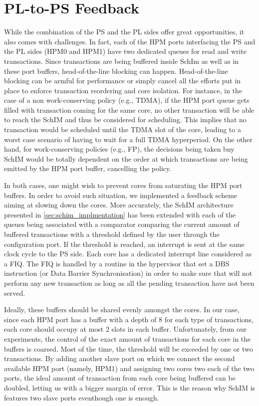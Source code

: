 \section{PL-to-PS Feedback}    
    While the combination of the PS and the PL sides offer great opportunities, it also comes with challenges. In fact, each of the HPM ports interfacing the PS and the PL sides (HPM0 and HPM1) have two dedicated queues for read and write transactions. Since transactions are being buffered inside SchIm as well as in these port buffers, head-of-the-line blocking can happen. Head-of-the-line blocking can be armful for performance or simply cancel all the efforts put in place to enforce transaction reordering and core isolation. For instance, in the case of a non work-conserving policy (e.g., TDMA), if the HPM port queue gets filled with transaction coming for the same core, no other transaction will be able to reach the SchIM and thus be considered for scheduling. This implies that no transaction would be scheduled until the TDMA slot of the core, leading to a worst case scenario of having to wait for a full TDMA hyperperiod. On the other hand, for work-conserving policies (e.g., FP), the decisions being taken bny SchIM would be totally dependent on the order at which transactions are being emitted by the HPM port buffer, cancelling the policy.
    
    In both cases, one might wish to prevent cores from saturating the HPM port buffers. In order to avoid such situation, we implemented a feedback scheme aiming at slowing down the cores. More accurately, the SchIM architecture presented in \ref{sec:schim_implmentation} has been extended with each of the queues being associated with a comparator comparing the current amount of buffered transactions with a threshold defined by the user through the configuration port. If the threshold is reached, an interrupt is sent at the same clock cycle to the PS side. Each core has a dedicated interrupt line considered as a FIQ. The FIQ is handled by a routine in the hypervisor that set a DBS instruction (or Data Barrier Synchronisation) in order to make sure that will not perform any new transaction as long as all the pending transaction have not been served.
    
    Ideally, these buffers should be shared evenly amongst the cores. In our case, since each HPM port has a buffer with a depth of 8 for each type of transactions, each core should occupy at most 2 slots in each buffer. Unfortunately, from our experiments, the control of the exact amount of transactions for each core in the buffers is coarsed. Most of the time, the threshold will be exceeded by one or two transactions. By adding another slave port on which we connect the second available HPM port (namely, HPM1) and assigning two cores two each of the two ports, the ideal amount of transaction from each core being buffered can be doubled, letting us with a bigger margin of error. This is the reason why SchIM is features two slave ports eventhough one is enough.
    
